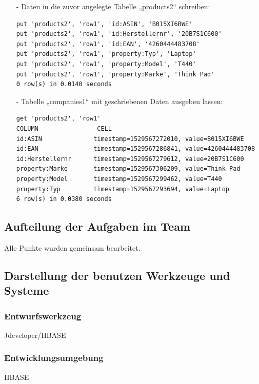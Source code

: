\begin{itemize}
\item[-] Daten in die zuvor angelegte Tabelle „products2“ schreiben:
\begin{lstlisting}
put 'products2', 'row1', 'id:ASIN', 'B015XI6BWE'
put 'products2', 'row1', 'id:Herstellernr', '20B7S1C600'
put 'products2', 'row1', 'id:EAN', '4260444483708'
put 'products2', 'row1', 'property:Typ', 'Laptop'
put 'products2', 'row1', 'property:Model', 'T440'
put 'products2', 'row1', 'property:Marke', 'Think Pad'
0 row(s) in 0.0140 seconds
\end{lstlisting}

\item[-] Tabelle „companies1“ mit geschriebenen Daten ausgeben lassen:
\begin{lstlisting}
get 'products2', 'row1'
COLUMN                CELL
id:ASIN              timestamp=1529567272010, value=B015XI6BWE
id:EAN               timestamp=1529567286841, value=4260444483708
id:Herstellernr      timestamp=1529567279612, value=20B7S1C600
property:Marke       timestamp=1529567306209, value=Think Pad
property:Model       timestamp=1529567299462, value=T440
property:Typ         timestamp=1529567293694, value=Laptop
6 row(s) in 0.0380 seconds
\end{lstlisting}
\end{itemize}
\subsection*{Aufteilung der Aufgaben im Team}
Alle Punkte wurden gemeinsam bearbeitet.
\subsection*{Darstellung der benutzen Werkzeuge und Systeme}

\subsubsection*{Entwurfswerkzeug}
Jdeveloper/HBASE
\subsubsection*{Entwicklungsumgebung}
HBASE
